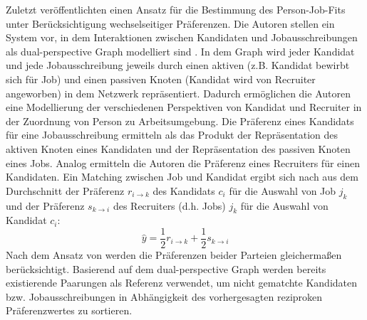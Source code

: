 Zuletzt veröffentlichten \textcite[S. 102ff.]{yang:inproceedings} einen Ansatz für die Bestimmung des Person-Job-Fits unter Berücksichtigung wechselseitiger Präferenzen.
Die Autoren stellen ein System vor, in dem Interaktionen zwischen Kandidaten und Jobausschreibungen als dual-perspective Graph modelliert sind \cite[S. 102]{yang:inproceedings}.
In dem Graph wird jeder Kandidat und jede Jobausschreibung jeweils durch einen aktiven (z.B. Kandidat bewirbt sich für Job) und einen passiven Knoten (Kandidat wird von Recruiter angeworben) in dem Netzwerk repräsentiert.
Dadurch ermöglichen die Autoren eine Modellierung der verschiedenen Perspektiven von Kandidat und Recruiter in der Zuordnung von Person zu Arbeitsumgebung.
Die Präferenz eines Kandidats für eine Jobausschreibung ermitteln \textcite[S. 106]{yang:inproceedings} als das Produkt der Repräsentation des aktiven Knoten eines Kandidaten und der Repräsentation des passiven Knoten eines Jobs.
Analog ermitteln die Autoren die Präferenz eines Recruiters für einen Kandidaten.
Ein Matching zwischen Job und Kandidat ergibt sich nach \textcite[S. 106]{yang:inproceedings} aus dem Durchschnitt der Präferenz $r_{i\rightarrow k}$ des Kandidats $c_{i}$ für die Auswahl von Job $j_{k}$ und der Präferenz $s_{k\rightarrow i}$ des Recruiters (d.h. Jobs) $j_{k}$ für die Auswahl von Kandidat $c_{i}$:
\begin{equation}\label{eq38}
    \hat{y} = \frac{1}{2} r_{i\rightarrow k} +\frac{1}{2} s_{k\rightarrow i}
\end{equation}
Nach dem Ansatz von \textcite[S. 102ff.]{yang:inproceedings} werden die Präferenzen beider Parteien gleichermaßen berücksichtigt.
Basierend auf dem dual-perspective Graph werden bereits existierende Paarungen als Referenz verwendet, um nicht gematchte Kandidaten bzw. Jobausschreibungen in Abhängigkeit des vorhergesagten reziproken Präferenzwertes zu sortieren.

